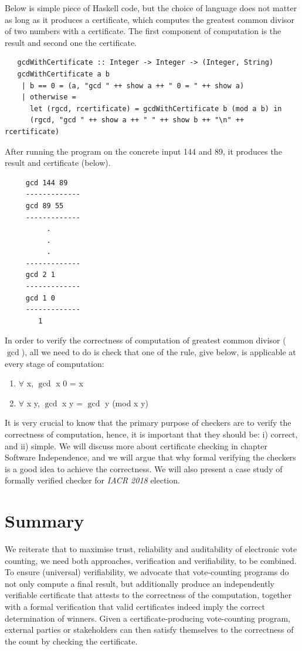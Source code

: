   \noindent
   Below is simple piece of Haskell code, but the choice of language does not matter as long as it 
   produces a certificate, which computes the greatest common divisor 
   of two numbers with a certificate.  The first component of computation is the result and second one 
   the certificate. 
   \begin{verbatim}
   gcdWithCertificate :: Integer -> Integer -> (Integer, String)
   gcdWithCertificate a b
    | b == 0 = (a, "gcd " ++ show a ++ " 0 = " ++ show a)
    | otherwise = 
      let (rgcd, rcertificate) = gcdWithCertificate b (mod a b) in
      (rgcd, "gcd " ++ show a ++ " " ++ show b ++ "\n" ++ rcertificate)
   \end{verbatim}
  
   \noindent 
   After running the program on the concrete input 144 and 89, it produces the result and certificate (below).
   \begin{verbatim}
     gcd 144 89
     -------------
     gcd 89 55
     -------------
          .
          .
          .
     -------------
     gcd 2 1
     -------------
     gcd 1 0 
     -------------
        1
   \end{verbatim}
   
   
   In order to verify the correctness of computation of greatest common divisor ($\gcd$), all we need to do is 
   check  that one of the rule, give below, is applicable at every stage of computation:
   \begin{enumerate}
   \item  $\forall$ x, $\gcd$ x 0 = x
   \item $\forall$ x y, $\gcd$ x y = $\gcd$ y (mod x y)
   \end{enumerate}
   
   \noindent 
  It is very crucial to know that the primary purpose of checkers are to verify the 
  correctness of computation, hence, it is important that they 
  should be: i) correct, and ii) simple.  We will discuss more about certificate checking 
  in chapter Software Independence,  and we will argue that why formal verifying the checkers is 
  a good idea to achieve the correctness.  We will also present a case study of 
  formally verified checker for \textit{IACR 2018} election.
  
  
    
   
\section{Summary}
We reiterate that to maximise trust, reliability and auditability of electronic vote counting, we
need both approaches, verification and verifiability, to be combined. To ensure
(universal) verifiability, we advocate that vote-counting programs
do not only compute a final result, but additionally produce an
independently verifiable certificate that attests to the correctness
of the computation, together with a formal verification that
valid certificates indeed imply the correct determination of
winners. Given a certificate-producing vote-counting program, external
parties or stakeholders can then satisfy themselves to the
correctness of the count by checking the certificate.    

